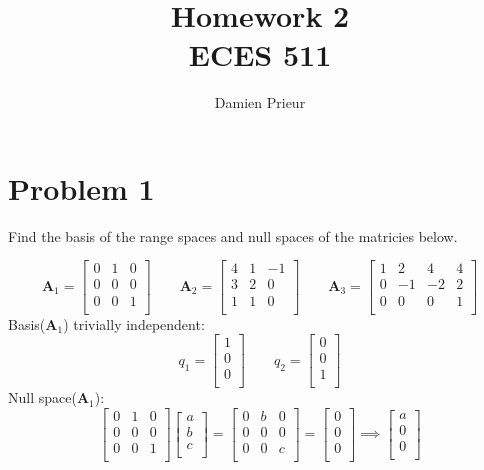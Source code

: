 \documentclass{article}
\author{Damien Prieur}
\title{Homework 2 \\ ECES 511}
\date{}
\begin{document}
\maketitle

\section*{Problem 1}
Find the basis of the range spaces and null spaces of the matricies below.

$$
\mathbf{A}_1
=
\begin{bmatrix}
0 & 1 & 0 \\
0 & 0 & 0 \\
0 & 0 & 1 \\
\end{bmatrix}
\qquad
\mathbf{A}_2
=
\begin{bmatrix}
4 & 1 & -1 \\
3 & 2 & 0 \\
1 & 1 & 0 \\
\end{bmatrix}
\qquad
\mathbf{A}_3
=
\begin{bmatrix}
1 & 2 & 4 & 4 \\
0 & -1& -2& 2 \\
0 & 0 & 0 & 1 \\
\end{bmatrix}
$$
Basis($\mathbf{A}_1$) trivially independent:
$$
q_1
=
\begin{bmatrix}
1 \\
0 \\
0 \\
\end{bmatrix}
\qquad
q_2
=
\begin{bmatrix}
0 \\
0 \\
1 \\
\end{bmatrix}
$$
Null space($\mathbf{A}_1$):
$$
\begin{bmatrix}
0 & 1 & 0 \\
0 & 0 & 0 \\
0 & 0 & 1 \\
\end{bmatrix}
\begin{bmatrix}
a \\
b \\
c \\
\end{bmatrix}
=
\begin{bmatrix}
0 & b & 0 \\
0 & 0 & 0 \\
0 & 0 & c \\
\end{bmatrix}
=
\begin{bmatrix}
0 \\
0 \\
0 \\
\end{bmatrix}
\implies
\begin{bmatrix}
a \\
0 \\
0 \\
\end{bmatrix}
$$
\end{document}

